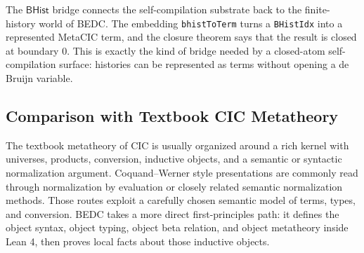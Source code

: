 
The $\mathsf{BHist}$ bridge connects the self-compilation substrate back to the
finite-history world of BEDC.  The embedding \texttt{bhistToTerm} turns a
\texttt{BHistIdx} into a represented MetaCIC term, and the closure theorem says
that the result is closed at boundary $0$.  This is exactly the kind of bridge
needed by a closed-atom self-compilation surface: histories can be represented
as terms without opening a de Bruijn variable.


\subsection{Comparison with Textbook CIC Metatheory}
\label{subsec:metatheory-textbook-comparison}

The textbook metatheory of CIC is usually organized around a rich kernel with
universes, products, conversion, inductive objects, and a semantic or syntactic
normalization argument.  Coquand--Werner style presentations are commonly read
through normalization by evaluation or closely related semantic normalization
methods.  Those routes exploit a carefully chosen semantic model of terms,
types, and conversion.  BEDC takes a more direct first-principles path: it
defines the object syntax, object typing, object beta relation, and object
metatheory inside Lean 4, then proves local facts about those inductive
objects.

